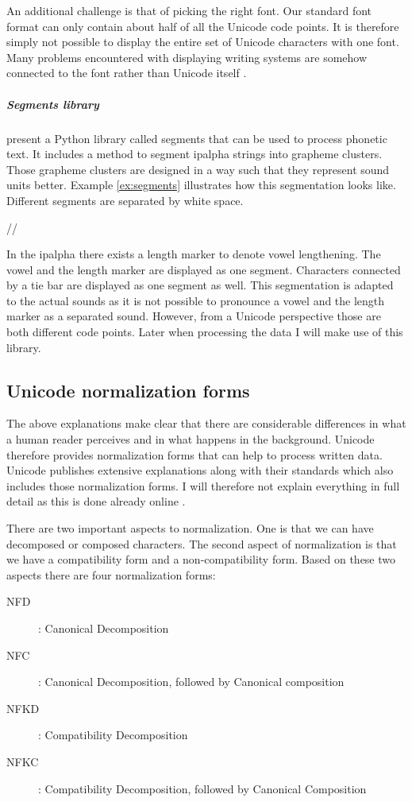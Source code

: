 An additional challenge is that of picking the right font. Our standard font format can only contain about half of all the Unicode code points. It is therefore simply not possible to display the entire set of Unicode characters with one font. Many problems encountered with displaying writing systems are somehow connected to the font rather than Unicode itself \citep{unicode-lingu}.

\subparagraph{Segments library} \citet{unicode-lingu} present a Python library called segments that can be used to process phonetic text. It includes a method to segment \ac{ipalpha} strings into grapheme clusters. Those grapheme clusters are designed in a way such that they represent sound units better. Example \ref{ex:segments} illustrates how this segmentation looks like. Different segments are separated by white space.

\begin{covexamples} 
\item \label{ex:segments} //
\end{covexamples}

In the \ac{ipalpha} there exists a length marker to denote vowel lengthening. The vowel and the length marker are displayed as one segment. Characters connected by a tie bar are displayed as one segment as well. This segmentation is adapted to the actual sounds as it is not possible to pronounce a vowel and the length marker as a separated sound. However, from a Unicode perspective those are both different code points. Later when processing the data I will make use of this library.

\subsection*{Unicode normalization forms}
The above explanations make clear that there are considerable differences in what a human reader perceives and in what happens in the background. Unicode therefore provides normalization forms that can help to process written data. Unicode publishes extensive explanations along with their standards which also includes those normalization forms. I will therefore not explain everything in full detail as this is done already online . 

There are two important aspects to normalization. One is that we can have decomposed or composed characters. The second aspect of normalization is that we have a compatibility form and a non-compatibility form. Based on these two aspects there are four normalization forms:
\begin{description}
\item[NFD] : Canonical Decomposition
\item[NFC] : Canonical Decomposition, followed by Canonical composition
\item[NFKD] : Compatibility Decomposition
\item[NFKC] : Compatibility Decomposition, followed by Canonical Composition
\end{description}

